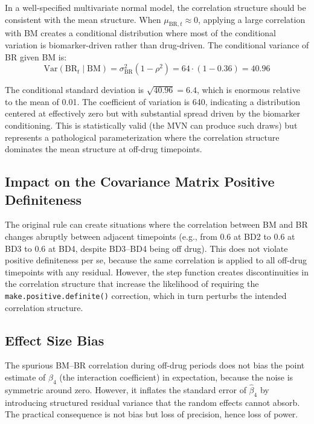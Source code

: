\documentclass[11pt]{article}
\begin{document}
In a well-specified multivariate normal model, the correlation
structure should be consistent with the mean structure. When
$\mu_{\text{BR},t} \approx 0$, applying a large correlation
with BM creates a conditional distribution where most of the
conditional variation is biomarker-driven rather than
drug-driven. The conditional variance of BR given BM is:
\[
\text{Var}(\text{BR}_t \mid \text{BM}) =
  \sigma_{\text{BR}}^2 (1 - \rho^2) =
  64 \cdot (1 - 0.36) = 40.96
\]

The conditional standard deviation is $\sqrt{40.96} = 6.4$,
which is enormous relative to the mean of 0.01. The
coefficient of variation is 640, indicating a distribution
centered at effectively zero but with substantial spread
driven by the biomarker conditioning. This is statistically
valid (the MVN can produce such draws) but represents a
pathological parameterization where the correlation structure
dominates the mean structure at off-drug timepoints.

\subsection{Impact on the Covariance Matrix Positive
            Definiteness}

The original rule can create situations where the correlation
between BM and BR changes abruptly between adjacent timepoints
(e.g., from 0.6 at BD2 to 0.6 at BD3 to 0.6 at BD4, despite
BD3--BD4 being off drug). This does not violate positive
definiteness per se, because the same correlation is applied
to all off-drug timepoints with any residual. However, the
step function creates discontinuities in the correlation
structure that increase the likelihood of requiring the
\texttt{make.positive.definite()} correction, which in turn
perturbs the intended correlation structure.

\subsection{Effect Size Bias}

The spurious BM--BR correlation during off-drug periods does
not bias the point estimate of $\beta_4$ (the interaction
coefficient) in expectation, because the noise is symmetric
around zero. However, it inflates the standard error of
$\hat{\beta}_4$ by introducing structured residual variance
that the random effects cannot absorb. The practical
consequence is not bias but loss of precision, hence loss
of power.
\end{document}

